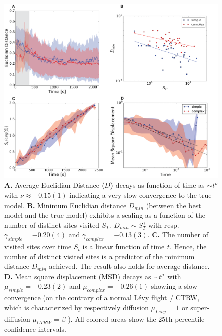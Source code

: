 \begin{figure}[h!]
\begin{center}
\includegraphics[width=16cm]{figures/Dmin_vs_St.png}
\caption{{\bf A.} Average Euclidian Distance $\langle D \rangle$ decays as function of time as $\sim t^{\nu}$ with $ \nu \approx -0.15(1)$ indicating a very slow convergence to the true model. {\bf B.} Minimum Euclidian distance $D_{min}$ (between the best model and the true model) exhibits a scaling as a function of the number of distinct sites visited $S_{T}$. $D_{min} \sim S_{T}^{\gamma}$ with resp. $\gamma_{simple} = -0.20(4)$ and $\gamma_{complex} = - 0.13(3)$. {\bf C.} The number of visited sites over time $S_t$ is a linear function of time $t$. Hence, the number of distinct visited sites is a predictor of the minimum distance $D_{min}$ achieved. The result also holds for average distance. {\bf D.} Mean square displacement (MSD) decays as $\sim t^{\mu}$ with $\mu_{simple} =-0.23(2)$ and $\mu_{complex} =- 0.26(1)$ showing a slow convergence (on the contrary of a normal L\'evy flight / CTRW, which is characterized by respectively diffusion $\mu_{Levy} = 1$ or super-diffusion $\mu_{CTRW} = \beta$ \cite{21,23}). All colored areas show the 25th percentile confidence intervals.}
\label{fig:Dmin_vs_St}
\end{center}
\end{figure}

